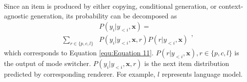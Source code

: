 \documentclass[letterpaper]{article} %
\begin{document}
	Since an item is produced by either copying, conditional generation, or context-agnostic generation, its probability can be decomposed as
	\begin{equation}
	\label{equ:Equation 17}
	\begin{aligned}
	& P(y_i | y_{<i}, \mathbf{x})  = \\
	\sum_{r \in \{p, c, l\}} & P(y_i | y_{<i}, \mathbf{x}, r) P(r | y_{<i}, \mathbf{x})
	\end{aligned},
	\end{equation}
	which corresponds to Equation \ref{equ:Equation 11}. $P(r | y_{<i}, \mathbf{x}), r \in \{p, c, l\}$ is the output of mode switcher. $P(y_i | y_{<i}, \mathbf{x}, r)$ is the next item distribution predicted by corresponding renderer. For example, $l$ represents language model.
\end{document}
